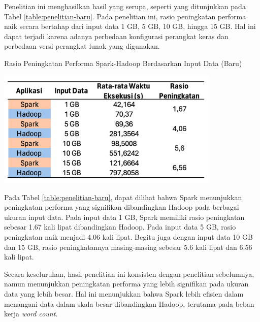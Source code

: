 Penelitian ini menghasilkan hasil yang serupa, seperti yang ditunjukkan pada Tabel \ref{table:penelitian-baru}. Pada penelitian ini, rasio peningkatan performa naik secara bertahap dari input data 1 GB, 5 GB, 10 GB, hingga 15 GB. Hal ini dapat terjadi karena adanya perbedaan konfigurasi perangkat keras dan perbedaan versi perangkat lunak yang digunakan.

\begin{table}[h]
  \centering
  \caption{Rasio Peningkatan Performa Spark-Hadoop Berdasarkan Input Data (Baru)}
  \includegraphics[width=0.8\textwidth]{figures/ch04/0-penelitian-baru}
  \label{table:penelitian-baru}
\end{table}

Pada Tabel \ref{table:penelitian-baru}, dapat dilihat bahwa Spark menunjukkan peningkatan performa yang signifikan dibandingkan Hadoop pada berbagai ukuran input data. Pada input data 1 GB, Spark memiliki rasio peningkatan sebesar 1.67 kali lipat dibandingkan Hadoop. Pada input data 5 GB, rasio peningkatan naik menjadi 4.06 kali lipat. Begitu juga dengan input data 10 GB dan 15 GB, rasio peningkatannya masing-masing sebesar 5.6 kali lipat dan 6.56 kali lipat.

Secara keseluruhan, hasil penelitian ini konsisten dengan penelitian sebelumnya, namun menunjukkan peningkatan performa yang lebih signifikan pada ukuran data yang lebih besar. Hal ini menunjukkan bahwa Spark lebih efisien dalam menangani data dalam skala besar dibandingkan Hadoop, terutama pada beban kerja \textit{word count}.


